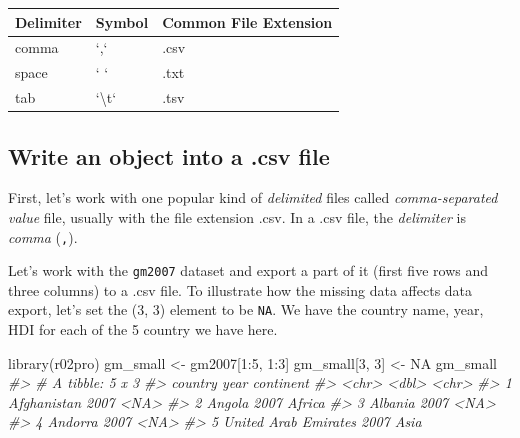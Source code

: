\documentclass[
]{book}
\newenvironment{Shaded}{\begin{snugshade}}{\end{snugshade}}
\newcommand{\CommentTok}[1]{\textcolor[rgb]{0.56,0.35,0.01}{\textit{#1}}}
\newcommand{\ConstantTok}[1]{\textcolor[rgb]{0.00,0.00,0.00}{#1}}
\newcommand{\DecValTok}[1]{\textcolor[rgb]{0.00,0.00,0.81}{#1}}
\newcommand{\FunctionTok}[1]{\textcolor[rgb]{0.00,0.00,0.00}{#1}}
\newcommand{\NormalTok}[1]{#1}
\newcommand{\OtherTok}[1]{\textcolor[rgb]{0.56,0.35,0.01}{#1}}
\newcommand{\SpecialCharTok}[1]{\textcolor[rgb]{0.00,0.00,0.00}{#1}}
\begin{document}
\begin{tabular}{l|l|l}
\hline
Delimiter & Symbol & Common File Extension\\
\hline
comma & `,` & .csv\\
\hline
space & ` ` & .txt\\
\hline
tab & `\textbackslash{}t` & .tsv\\
\hline
\end{tabular}

\hypertarget{write-csv}{%
\subsection{Write an object into a .csv file}\label{write-csv}}

First, let's work with one popular kind of \emph{delimited} files called \emph{comma-separated value} file, usually with the file extension .csv. In a .csv file, the \emph{delimiter} is \emph{comma} (\texttt{,}).

Let's work with the \texttt{gm2007} dataset and export a part of it (first five rows and three columns) to a .csv file. To illustrate how the missing data affects data export, let's set the (3, 3) element to be \texttt{NA}. We have the country name, year, HDI for each of the 5 country we have here.

\begin{Shaded}
\begin{Highlighting}[]
\FunctionTok{library}\NormalTok{(r02pro)}
\NormalTok{gm\_small }\OtherTok{\textless{}{-}}\NormalTok{ gm2007[}\DecValTok{1}\SpecialCharTok{:}\DecValTok{5}\NormalTok{, }\DecValTok{1}\SpecialCharTok{:}\DecValTok{3}\NormalTok{]}
\NormalTok{gm\_small[}\DecValTok{3}\NormalTok{, }\DecValTok{3}\NormalTok{] }\OtherTok{\textless{}{-}} \ConstantTok{NA}
\NormalTok{gm\_small}
\CommentTok{\#\textgreater{} \# A tibble: 5 x 3}
\CommentTok{\#\textgreater{}   country               year continent}
\CommentTok{\#\textgreater{}   \textless{}chr\textgreater{}                \textless{}dbl\textgreater{} \textless{}chr\textgreater{}    }
\CommentTok{\#\textgreater{} 1 Afghanistan           2007 \textless{}NA\textgreater{}     }
\CommentTok{\#\textgreater{} 2 Angola                2007 Africa   }
\CommentTok{\#\textgreater{} 3 Albania               2007 \textless{}NA\textgreater{}     }
\CommentTok{\#\textgreater{} 4 Andorra               2007 \textless{}NA\textgreater{}     }
\CommentTok{\#\textgreater{} 5 United Arab Emirates  2007 Asia}
\end{Highlighting}
\end{Shaded}
\end{document}
